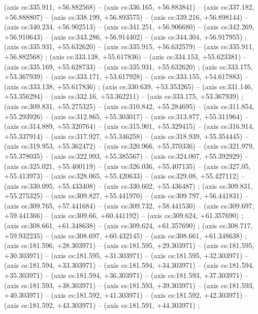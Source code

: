     (axis cs:335.911,    +56.882568) --  (axis cs:336.165,    +56.883841) --  (axis cs:337.182,    +56.888807) --  (axis cs:338.199,    +56.893575) --  (axis cs:339.216,    +56.898144) --  (axis cs:340.234,    +56.902513) --  (axis cs:341.251,    +56.906680) --  (axis cs:342.269,    +56.910643) --  (axis cs:343.286,    +56.914402) --  (axis cs:344.304,    +56.917955) ;
    (axis cs:335.931,    +55.632620) --  (axis cs:335.915,    +56.632579) --  (axis cs:335.911,    +56.882568) ;
    (axis cs:333.138,    +55.617836) --  (axis cs:334.153,    +55.623381) --  (axis cs:335.169,    +55.628733) --  (axis cs:335.931,    +55.632620) ;
    (axis cs:333.175,    +53.367939) --  (axis cs:333.171,    +53.617928) --  (axis cs:333.155,    +54.617883) --  (axis cs:333.138,    +55.617836) ;
    (axis cs:330.639,    +53.353265) --  (axis cs:331.146,    +53.356294) --  (axis cs:332.16,    +53.362211) --  (axis cs:333.175,    +53.367939) ;
    (axis cs:309.831,    +55.275325) --  (axis cs:310.842,    +55.284695) --  (axis cs:311.854,    +55.293926) --  (axis cs:312.865,    +55.303017) --  (axis cs:313.877,    +55.311964) --  (axis cs:314.889,    +55.320764) --  (axis cs:315.901,    +55.329415) --  (axis cs:316.914,    +55.337914) --  (axis cs:317.927,    +55.346258) --  (axis cs:318.939,    +55.354445) --  (axis cs:319.953,    +55.362472) --  (axis cs:320.966,    +55.370336) --  (axis cs:321.979,    +55.378035) --  (axis cs:322.993,    +55.385567) --  (axis cs:324.007,    +55.392929) --  (axis cs:325.021,    +55.400119) --  (axis cs:326.036,    +55.407135) --  (axis cs:327.05,    +55.413973) --  (axis cs:328.065,    +55.420633) --  (axis cs:329.08,    +55.427112) --  (axis cs:330.095,    +55.433408) --  (axis cs:330.602,    +55.436487) ;
    (axis cs:309.831,    +55.275325) --  (axis cs:309.827,    +55.441970) --  (axis cs:309.797,    +56.441831) --  (axis cs:309.765,    +57.441684) --  (axis cs:309.732,    +58.441530) --  (axis cs:309.697,    +59.441366) --  (axis cs:309.66,    +60.441192) --  (axis cs:309.624,    +61.357690) ;
    (axis cs:308.661,    +61.348638) --  (axis cs:309.624,    +61.357690) ;
    (axis cs:308.717,    +59.932235) --  (axis cs:308.697,    +60.432145) --  (axis cs:308.661,    +61.348638) ;
    (axis cs:181.596,    +28.303971) --  (axis cs:181.595,    +29.303971) --  (axis cs:181.595,    +30.303971) --  (axis cs:181.595,    +31.303971) --  (axis cs:181.595,    +32.303971) --  (axis cs:181.594,    +33.303971) --  (axis cs:181.594,    +34.303971) --  (axis cs:181.594,    +35.303971) --  (axis cs:181.594,    +36.303971) --  (axis cs:181.593,    +37.303971) --  (axis cs:181.593,    +38.303971) --  (axis cs:181.593,    +39.303971) --  (axis cs:181.593,    +40.303971) --  (axis cs:181.592,    +41.303971) --  (axis cs:181.592,    +42.303971) --  (axis cs:181.592,    +43.303971) --  (axis cs:181.591,    +44.303971) ;
